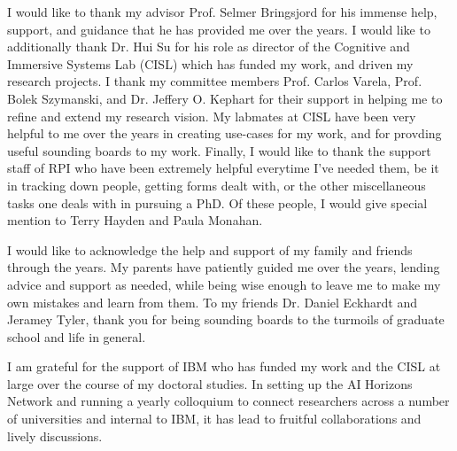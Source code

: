  
 
I would like to thank my advisor Prof. Selmer Bringsjord for his immense help, support, and guidance
that he has provided me over the years. I would like to additionally thank Dr. Hui Su for his
role as director of the Cognitive and Immersive Systems Lab (CISL) which has funded my work, and driven
my research projects. I thank my committee members Prof. Carlos Varela, Prof. Bolek Szymanski, and
Dr. Jeffery O. Kephart for their support in helping me to refine and extend my research vision. My
labmates at CISL have been very helpful to me over the years in creating use-cases for my work,
and for provding useful sounding boards to my work. Finally, I would like to thank the support
staff of RPI who have been extremely helpful everytime I've needed them, be it in tracking down
people, getting forms dealt with, or the other miscellaneous tasks one deals with in pursuing a
PhD. Of these people, I would give special mention to Terry Hayden and Paula Monahan.

I would like to acknowledge the help and support of my family and friends through the years.
My parents have patiently guided me over the years, lending advice and support as needed, while
being wise enough to leave me to make my own mistakes and learn from them. To my friends Dr. Daniel
Eckhardt and Jeramey Tyler, thank you for being sounding boards to the turmoils of graduate school
and life in general.

I am grateful for the support of IBM who has funded my work and the CISL at large over the
course of my doctoral studies. In setting up the AI Horizons Network and running a yearly
colloquium to connect researchers across a number of universities and internal to IBM, it has
lead to fruitful collaborations and lively discussions.